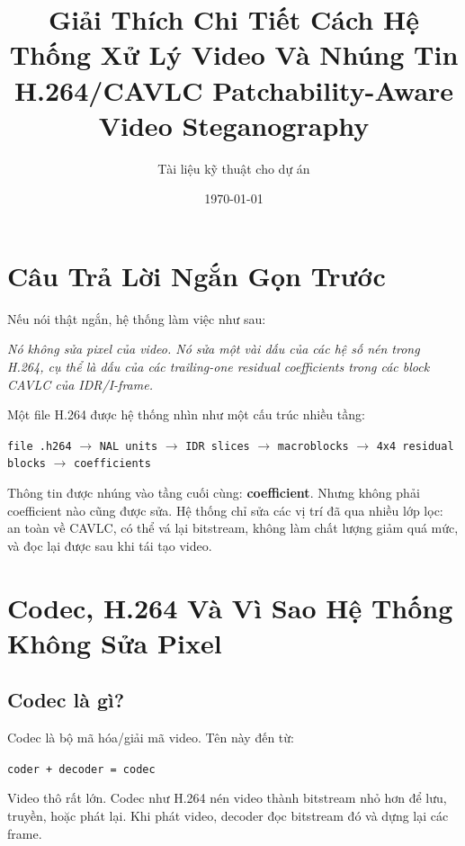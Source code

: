 \documentclass[11pt,a4paper]{article}
\title{\textbf{Giải Thích Chi Tiết Cách Hệ Thống Xử Lý Video Và Nhúng Tin}\\
\large H.264/CAVLC Patchability-Aware Video Steganography}
\author{Tài liệu kỹ thuật cho dự án}
\date{\today}
\begin{document}
\maketitle

\section{Câu Trả Lời Ngắn Gọn Trước}

Nếu nói thật ngắn, hệ thống làm việc như sau:

\begin{center}
\textit{Nó không sửa pixel của video. Nó sửa một vài dấu của các hệ số nén
trong H.264, cụ thể là dấu của các trailing-one residual coefficients trong
các block CAVLC của IDR/I-frame.}
\end{center}

Một file H.264 được hệ thống nhìn như một cấu trúc nhiều tầng:

\begin{center}
\texttt{file .h264}
\(\rightarrow\)
\texttt{NAL units}
\(\rightarrow\)
\texttt{IDR slices}
\(\rightarrow\)
\texttt{macroblocks}
\(\rightarrow\)
\texttt{4x4 residual blocks}
\(\rightarrow\)
\texttt{coefficients}
\end{center}

Thông tin được nhúng vào tầng cuối cùng: \textbf{coefficient}. Nhưng không phải
coefficient nào cũng được sửa. Hệ thống chỉ sửa các vị trí đã qua nhiều lớp
lọc: an toàn về CAVLC, có thể vá lại bitstream, không làm chất lượng giảm quá
mức, và đọc lại được sau khi tái tạo video.

\section{Codec, H.264 Và Vì Sao Hệ Thống Không Sửa Pixel}

\subsection{Codec là gì?}

Codec là bộ mã hóa/giải mã video. Tên này đến từ:

\begin{center}
\texttt{coder + decoder = codec}
\end{center}

Video thô rất lớn. Codec như H.264 nén video thành bitstream nhỏ hơn để lưu,
truyền, hoặc phát lại. Khi phát video, decoder đọc bitstream đó và dựng lại
các frame.
\end{document}
